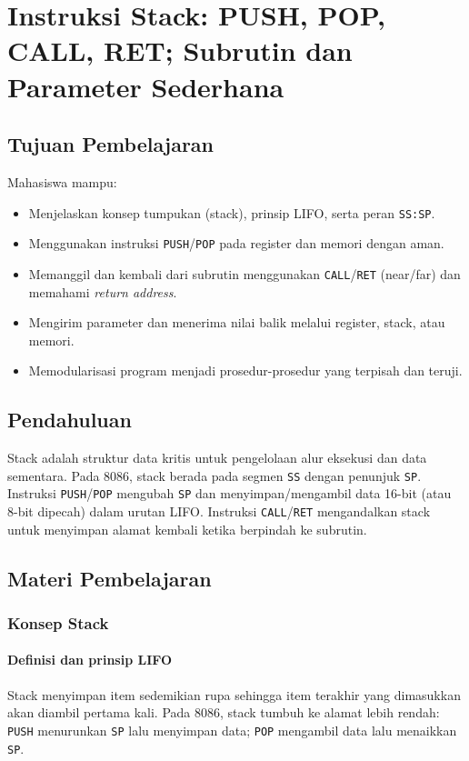 \chapter{Instruksi Stack: PUSH, POP, CALL, RET; Subrutin dan Parameter Sederhana}

\section{Tujuan Pembelajaran}
Mahasiswa mampu:
\begin{itemize}
  \item Menjelaskan konsep tumpukan (stack), prinsip LIFO, serta peran \texttt{SS:SP}.
  \item Menggunakan instruksi \texttt{PUSH}/\texttt{POP} pada register dan memori dengan aman.
  \item Memanggil dan kembali dari subrutin menggunakan \texttt{CALL}/\texttt{RET} (near/far) dan memahami \textit{return address}.
  \item Mengirim parameter dan menerima nilai balik melalui register, stack, atau memori.
  \item Memodularisasi program menjadi prosedur-prosedur yang terpisah dan teruji.
\end{itemize}

\section{Pendahuluan}
Stack adalah struktur data kritis untuk pengelolaan alur eksekusi dan data sementara. Pada 8086, stack berada pada segmen \texttt{SS} dengan penunjuk \texttt{SP}. Instruksi \texttt{PUSH}/\texttt{POP} mengubah \texttt{SP} dan menyimpan/mengambil data 16-bit (atau 8-bit dipecah) dalam urutan LIFO. Instruksi \texttt{CALL}/\texttt{RET} mengandalkan stack untuk menyimpan alamat kembali ketika berpindah ke subrutin.

\section{Materi Pembelajaran}
\subsection{Konsep Stack}
\subsubsection{Definisi dan prinsip LIFO}
Stack menyimpan item sedemikian rupa sehingga item terakhir yang dimasukkan akan diambil pertama kali. Pada 8086, stack tumbuh ke alamat lebih rendah: \texttt{PUSH} menurunkan \texttt{SP} lalu menyimpan data; \texttt{POP} mengambil data lalu menaikkan \texttt{SP}.


